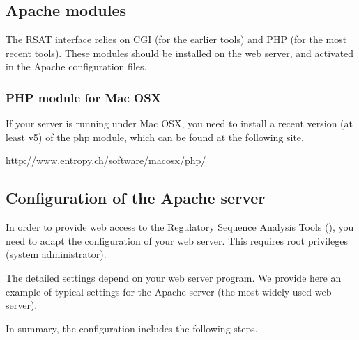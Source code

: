 \documentclass[12pt,a4paper, twoside]{scrreprt} %
\begin{document}
\subsection{Apache modules}

The RSAT interface relies on CGI (for the earlier tools) and PHP (for
the most recent tools). These modules should be installed on the web
server, and activated in the Apache configuration files. 

\subsubsection{PHP module for Mac OSX}

If your server is running under Mac OSX, you need to install a recent
version (at least v5) of the php module, which can be found at the following site. 

\url{http://www.entropy.ch/software/macosx/php/}

\subsection{Configuration of the Apache server}

In order to provide web access to the Regulatory Sequence Analysis
Tools (\RSAT), you need to adapt the configuration of your web
server. This requires root privileges (system administrator).


The detailed settings depend on your web server program. We provide
here an example of typical settings for the Apache server (the most
widely used web server).

In summary, the configuration includes the following steps.
\end{document}
